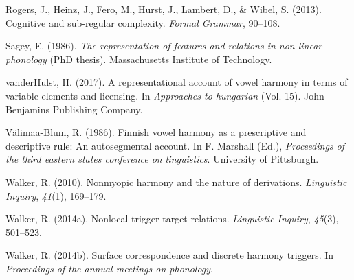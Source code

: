 \documentclass[floatsintext,man]{apa6}
\theoremstyle{definition}
\theoremstyle{definition}
\theoremstyle{definition}
\theoremstyle{remark}
\begin{document}
\hypertarget{ref-rogersetal2013}{}
Rogers, J., Heinz, J., Fero, M., Hurst, J., Lambert, D., \& Wibel, S.
(2013). Cognitive and sub-regular complexity. \emph{Formal Grammar},
90--108.

\hypertarget{ref-sagey1986}{}
Sagey, E. (1986). \emph{The representation of features and relations in
non-linear phonology} (PhD thesis). Massachusetts Institute of
Technology.

\hypertarget{ref-vdHulst2017}{}
vanderHulst, H. (2017). A representational account of vowel harmony in
terms of variable elements and licensing. In \emph{Approaches to
hungarian} (Vol. 15). John Benjamins Publishing Company.

\hypertarget{ref-valimaablum1986}{}
Välimaa-Blum, R. (1986). Finnish vowel harmony as a prescriptive and
descriptive rule: An autosegmental account. In F. Marshall (Ed.),
\emph{Proceedings of the third eastern states conference on
linguistics}. University of Pittsburgh.

\hypertarget{ref-walker2010}{}
Walker, R. (2010). Nonmyopic harmony and the nature of derivations.
\emph{Linguistic Inquiry}, \emph{41}(1), 169--179.

\hypertarget{ref-walkeroroquen}{}
Walker, R. (2014a). Nonlocal trigger-target relations. \emph{Linguistic
Inquiry}, \emph{45}(3), 501--523.

\hypertarget{ref-walker2014}{}
Walker, R. (2014b). Surface correspondence and discrete harmony
triggers. In \emph{Proceedings of the annual meetings on phonology}.
\end{document}
